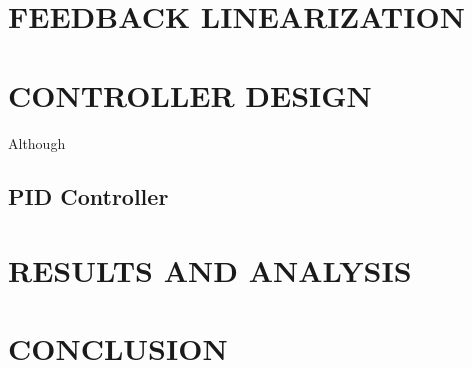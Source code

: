 \documentclass[10pt,twocolumn]{witseiepaper}
\begin{document}
\section{FEEDBACK LINEARIZATION}


\section{CONTROLLER DESIGN}
Although 




\subsection{PID Controller}


\section{RESULTS AND ANALYSIS}

\section{CONCLUSION}










\end{document}
